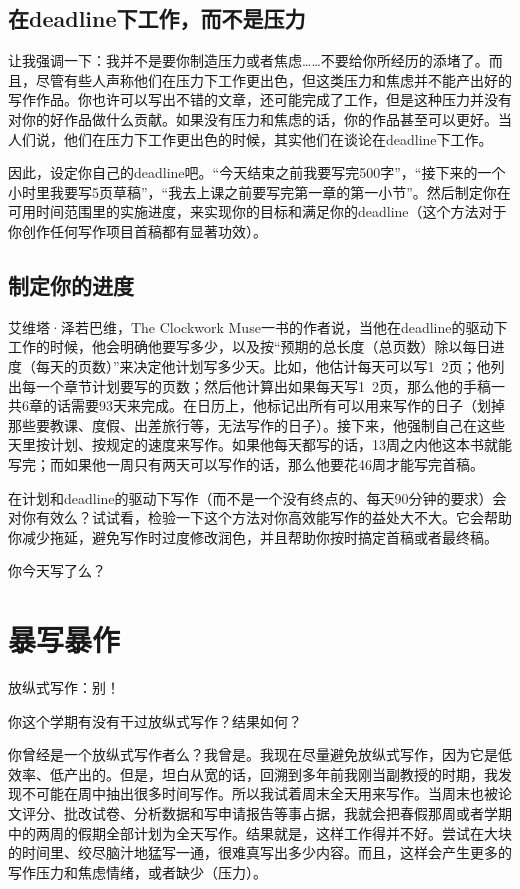 \documentclass{ctexart}
\begin{document}
\subsection{在deadline下工作，而不是压力}

让我强调一下：我并不是要你制造压力或者焦虑……不要给你所经历的添堵了。而且，尽管有些人声称他们在压力下工作更出色，但这类压力和焦虑并不能产出好的写作作品。你也许可以写出不错的文章，还可能完成了工作，但是这种压力并没有对你的好作品做什么贡献。如果没有压力和焦虑的话，你的作品甚至可以更好。当人们说，他们在压力下工作更出色的时候，其实他们在谈论在deadline下工作。

因此，设定你自己的deadline吧。“今天结束之前我要写完500字”，“接下来的一个小时里我要写5页草稿”，“我去上课之前要写完第一章的第一小节”。然后制定你在可用时间范围里的实施进度，来实现你的目标和满足你的deadline（这个方法对于你创作任何写作项目首稿都有显著功效）。

\subsection{制定你的进度}

艾维塔·泽若巴维，The Clockwork Muse一书的作者说，当他在deadline的驱动下工作的时候，他会明确他要写多少，以及按“预期的总长度（总页数）除以每日进度（每天的页数）”来决定他计划写多少天。比如，他估计每天可以写1~2页；他列出每一个章节计划要写的页数；然后他计算出如果每天写1~2页，那么他的手稿一共6章的话需要93天来完成。在日历上，他标记出所有可以用来写作的日子（划掉那些要教课、度假、出差旅行等，无法写作的日子）。接下来，他强制自己在这些天里按计划、按规定的速度来写作。如果他每天都写的话，13周之内他这本书就能写完；而如果他一周只有两天可以写作的话，那么他要花46周才能写完首稿。

在计划和deadline的驱动下写作（而不是一个没有终点的、每天90分钟的要求）会对你有效么？试试看，检验一下这个方法对你高效能写作的益处大不大。它会帮助你减少拖延，避免写作时过度修改润色，并且帮助你按时搞定首稿或者最终稿。

你今天写了么？

\section{暴写暴作}
放纵式写作：别！

你这个学期有没有干过放纵式写作？结果如何？

你曾经是一个放纵式写作者么？我曾是。我现在尽量避免放纵式写作，因为它是低效率、低产出的。但是，坦白从宽的话，回溯到多年前我刚当副教授的时期，我发现不可能在周中抽出很多时间写作。所以我试着周末全天用来写作。当周末也被论文评分、批改试卷、分析数据和写申请报告等事占据，我就会把春假那周或者学期中的两周的假期全部计划为全天写作。结果就是，这样工作得并不好。尝试在大块的时间里、绞尽脑汁地猛写一通，很难真写出多少内容。而且，这样会产生更多的写作压力和焦虑情绪，或者缺少（压力）。
\end{document}
